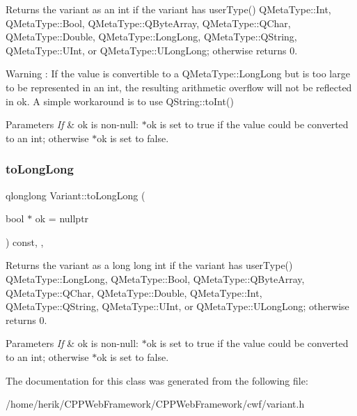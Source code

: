 Returns the variant as an int if the variant has user\+Type() Q\+Meta\+Type\+::\+Int, Q\+Meta\+Type\+::\+Bool, Q\+Meta\+Type\+::\+Q\+Byte\+Array, Q\+Meta\+Type\+::\+Q\+Char, Q\+Meta\+Type\+::\+Double, Q\+Meta\+Type\+::\+Long\+Long, Q\+Meta\+Type\+::\+Q\+String, Q\+Meta\+Type\+::\+U\+Int, or Q\+Meta\+Type\+::\+U\+Long\+Long; otherwise returns 0. 

\begin{DoxyWarning}{Warning}
\+: If the value is convertible to a Q\+Meta\+Type\+::\+Long\+Long but is too large to be represented in an int, the resulting arithmetic overflow will not be reflected in ok. A simple workaround is to use Q\+String\+::to\+Int() 
\end{DoxyWarning}

\begin{DoxyParams}{Parameters}
{\em If} & ok is non-\/null\+: $\ast$ok is set to true if the value could be converted to an int; otherwise $\ast$ok is set to false. \\
\hline
\end{DoxyParams}
\mbox{\label{class_variant_a4181b7ff9d27ae4936a6e91c9a9d7e26}} 
\subsubsection{\texorpdfstring{to\+Long\+Long}{toLongLong}}
{\footnotesize\ttfamily qlonglong Variant\+::to\+Long\+Long (\begin{DoxyParamCaption}\item[{bool $\ast$}]{ok = {\ttfamily nullptr} }\end{DoxyParamCaption}) const\hspace{0.3cm}{\ttfamily [inline]}, {\ttfamily [slot]}, {\ttfamily [noexcept]}}



Returns the variant as a long long int if the variant has user\+Type() Q\+Meta\+Type\+::\+Long\+Long, Q\+Meta\+Type\+::\+Bool, Q\+Meta\+Type\+::\+Q\+Byte\+Array, Q\+Meta\+Type\+::\+Q\+Char, Q\+Meta\+Type\+::\+Double, Q\+Meta\+Type\+::\+Int, Q\+Meta\+Type\+::\+Q\+String, Q\+Meta\+Type\+::\+U\+Int, or Q\+Meta\+Type\+::\+U\+Long\+Long; otherwise returns 0. 


\begin{DoxyParams}{Parameters}
{\em If} & ok is non-\/null\+: $\ast$ok is set to true if the value could be converted to an int; otherwise $\ast$ok is set to false. \\
\hline
\end{DoxyParams}


The documentation for this class was generated from the following file\+:\begin{DoxyCompactItemize}
\item 
/home/herik/\+C\+P\+P\+Web\+Framework/\+C\+P\+P\+Web\+Framework/cwf/variant.\+h\end{DoxyCompactItemize}
